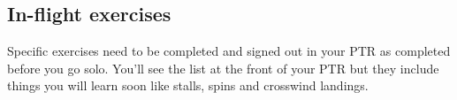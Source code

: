 \documentclass[12pt,letterpaper]{article}
\begin{document}
    \subsection{In-flight exercises}
    Specific exercises need to be completed and signed out in your PTR as completed before you go solo. You'll see the list at the front of your PTR but they include things you will learn soon like stalls, spins and crosswind landings.

\newpage
\begin{versionhistory}
\end{versionhistory}
\end{document}
